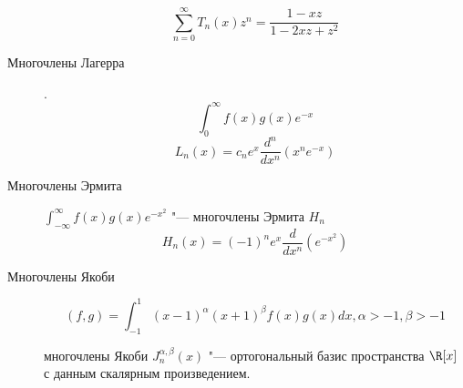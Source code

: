\begin{description}
$$\sum_{n = 0}^{\infty} T_n(x)z^n = \frac{1 - xz}{1 - 2xz + z^2} $$
\item [Многочлены Лагерра]. 
$$\int_{0}^{\infty}f(x)g(x)e^{-x}$$
$$L_n(x) = c_ne^x \frac{d^n}{dx^n}(x^ne^{-x}) $$
\item [Многочлены Эрмита]
$\int_{- \infty}^{\infty}f(x)g(x)e^{-x^2}$  "--- многочлены Эрмита $H_n$
$$H_n(x) = (-1)^ne^x\frac{d}{dx^n}(e^{-x^2})$$
\item [Многочлены Якоби]
$$(f, g) = \int_{-1}^{1}(x - 1)^{\alpha}(x + 1)^{\beta}f(x)g(x)dx, \alpha > -1, \beta > -1$$

многочлены Якоби $J_n^{\alpha, \beta}(x)$ "--- ортогональный базис пространства $\R[x]$ с данным скалярным произведением. 
\end{description}
